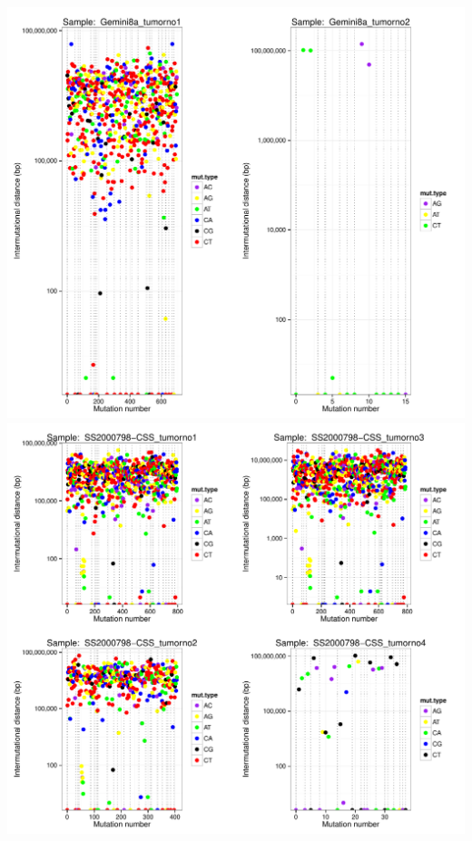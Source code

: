 \documentclass[a4paper,11pt]{article}
\begin{document}
\includegraphics{CLLpilot_rainfallplots_pub-006}
\\
\includegraphics{CLLpilot_rainfallplots_pub-007}
\\
\end{document}
